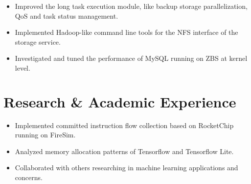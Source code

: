 \documentclass{resume}
\newcommand{\en}[1]{#1}
\newcommand{\zh}[1]{}
\begin{document}
\en{}
\zh{\datedsubsection{\textbf{\href{https://www.smartx.com/}{北京志凌海纳科技有限公司（SmartX Inc.）}}}{2019/09 -- 2020/01}}
\en{}
\zh{\role{分布式存储系统(ZBS)}{C++研发实习}}
\begin{itemize}
      \item \en{Improved the long task execution module, like backup storage parallelization, QoS and task status management.}
            \zh{改进了 ZBS 的长任务执行模块（Task Center），如支持备份存储过程批并行化、QoS 限速及任务的状态控制等。}
      \item \en{Implemented Hadoop-like command line tools for the NFS interface of the storage service.}
            \zh{为存储服务的 NFS 接口实现了一整套类似于 Hadoop HDFS 的命令行工具。}
      \item \en{Investigated and tuned the performance of MySQL running on ZBS at kernel level.}
            \zh{在内核层面调查并调优了 MySQL 运行在 ZBS 上的一些性能问题。}
\end{itemize}

\section{\en{Research \& Academic Experience}\zh{研究经历}}
\en{}
\zh{\datedsubsection{\textbf{清华大学网络大数据技术研究中心}}{2020/02 -- 2020/07}}
\en{}
\zh{\role{RISC-V 可信执行环境}{科研实习}}
\begin{itemize}
      \item \en{Implemented committed instruction flow collection based on RocketChip running on FireSim.}
            \zh{实现了 FireSim 上基于 RocketChip 的指令流收集。}
      \item \en{Analyzed memory allocation patterns of Tensorflow and Tensorflow Lite.}
            \zh{分析了 Tensorflow 与 Tensorflow Lite 框架内存分配的特征。}
\end{itemize}

\en{}
\zh{\datedsubsection{\textbf{英国剑桥大学人工智能暑期交流项目}}{2018/07 -- 2018/08}}
\en{}
\zh{\role{学生}{暑期交流}}
\begin{itemize}
      \item \en{Collaborated with others researching in machine learning applications and concerns.}
            \zh{在小组中担任领导角色，研究机器学习应用问题，负责了小组展示的选题与组织。}
\end{itemize}
\end{document}
